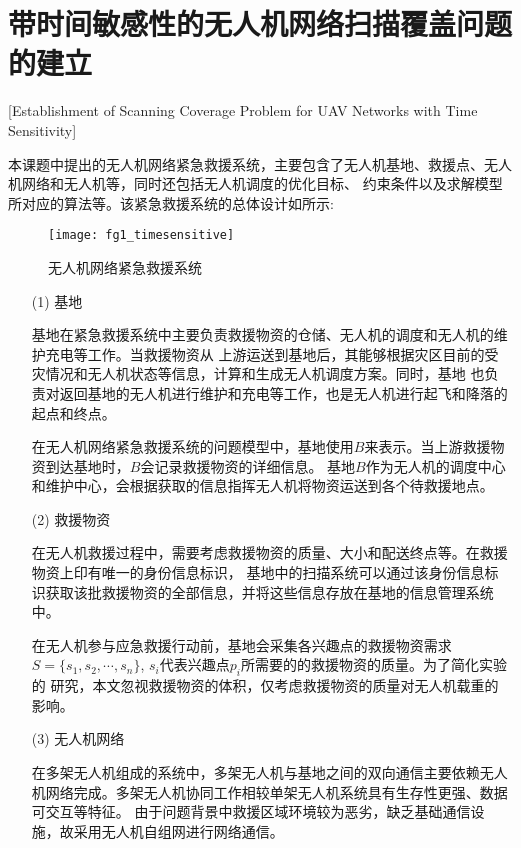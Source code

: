 \section{带时间敏感性的无人机网络扫描覆盖问题的建立}[Establishment of Scanning Coverage Problem for UAV Networks with Time Sensitivity]

本课题中提出的无人机网络紧急救援系统，主要包含了无人机基地、救援点、无人机网络和无人机等，同时还包括无人机调度的优化目标、
约束条件以及求解模型所对应的算法等。该紧急救援系统的总体设计如所示:

\begin{figure}[ht]
	\centering
	\texttt{[image: fg1\_timesensitive]}
	\caption{无人机网络紧急救援系统}
	\label{fg201}
\end{figure}

\begin{itemize}
	\item [(1)]  
	基地


	\qquad 基地在紧急救援系统中主要负责救援物资的仓储、无人机的调度和无人机的维护充电等工作。当救援物资从
	上游运送到基地后，其能够根据灾区目前的受灾情况和无人机状态等信息，计算和生成无人机调度方案。同时，基地
	也负责对返回基地的无人机进行维护和充电等工作，也是无人机进行起飞和降落的起点和终点。


	\qquad 在无人机网络紧急救援系统的问题模型中，基地使用$B$来表示。当上游救援物资到达基地时，$B$会记录救援物资的详细信息。
	基地$B$作为无人机的调度中心和维护中心，会根据获取的信息指挥无人机将物资运送到各个待救援地点。

	\item[(2)]
	救援物资

	
	\qquad 在无人机救援过程中，需要考虑救援物资的质量、大小和配送终点等。在救援物资上印有唯一的身份信息标识，
	基地中的扫描系统可以通过该身份信息标识获取该批救援物资的全部信息，并将这些信息存放在基地的信息管理系统中。


	\qquad 在无人机参与应急救援行动前，基地会采集各兴趣点的救援物资需求$S=\lbrace s_1, s_2, \cdots ,s_n \rbrace$, $s_i$代表兴趣点$p_i$所需要的的救援物资的质量。为了简化实验的
	研究，本文忽视救援物资的体积，仅考虑救援物资的质量对无人机载重的影响。

	\item[(3)]
	无人机网络

	\qquad 在多架无人机组成的系统中，多架无人机与基地之间的双向通信主要依赖无人机网络完成。多架无人机协同工作相较单架无人机系统具有生存性更强、数据可交互等特征。
	由于问题背景中救援区域环境较为恶劣，缺乏基础通信设施，故采用无人机自组网进行网络通信。



\end{itemize}
